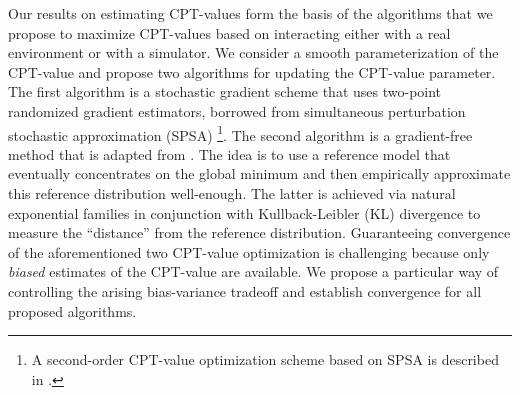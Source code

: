 Our results on estimating CPT-values form the basis of the algorithms that we propose to maximize CPT-values based on interacting either with a real environment or with a simulator. 
We consider a smooth parameterization of the CPT-value and propose two algorithms for updating the CPT-value parameter. The first algorithm is a stochastic gradient scheme that uses two-point randomized gradient estimators, borrowed from simultaneous perturbation stochastic approximation (SPSA) \cite{spall}\footnote{A second-order CPT-value optimization scheme based on SPSA is described in \cite{la2016cumulative}.}. 
The second algorithm is a gradient-free method that is adapted from \cite{chang2013simulation}. The idea is to use a reference model that eventually concentrates on the global minimum and then empirically approximate this reference distribution well-enough. The latter is achieved via natural exponential families in conjunction with Kullback-Leibler (KL) divergence to measure the ``distance'' from the reference distribution. 
Guaranteeing convergence of the aforementioned two CPT-value optimization is challenging because only  \emph{biased} estimates of the CPT-value are available. We propose a particular way of controlling the arising bias-variance tradeoff and establish convergence for all proposed algorithms.

